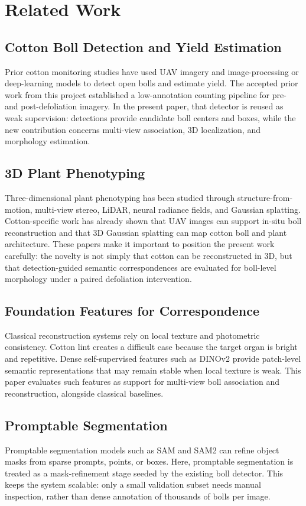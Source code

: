 \section{Related Work}

\subsection{Cotton Boll Detection and Yield Estimation}

Prior cotton monitoring studies have used UAV imagery and image-processing or deep-learning models to detect open bolls and estimate yield. The accepted prior work from this project established a low-annotation counting pipeline for pre- and post-defoliation imagery. In the present paper, that detector is reused as weak supervision: detections provide candidate boll centers and boxes, while the new contribution concerns multi-view association, 3D localization, and morphology estimation.

\subsection{3D Plant Phenotyping}

Three-dimensional plant phenotyping has been studied through structure-from-motion, multi-view stereo, LiDAR, neural radiance fields, and Gaussian splatting. Cotton-specific work has already shown that UAV images can support in-situ boll reconstruction and that 3D Gaussian splatting can map cotton boll and plant architecture. These papers make it important to position the present work carefully: the novelty is not simply that cotton can be reconstructed in 3D, but that detection-guided semantic correspondences are evaluated for boll-level morphology under a paired defoliation intervention.

\subsection{Foundation Features for Correspondence}

Classical reconstruction systems rely on local texture and photometric consistency. Cotton lint creates a difficult case because the target organ is bright and repetitive. Dense self-supervised features such as DINOv2 provide patch-level semantic representations that may remain stable when local texture is weak. This paper evaluates such features as support for multi-view boll association and reconstruction, alongside classical baselines.

\subsection{Promptable Segmentation}

Promptable segmentation models such as SAM and SAM2 can refine object masks from sparse prompts, points, or boxes. Here, promptable segmentation is treated as a mask-refinement stage seeded by the existing boll detector. This keeps the system scalable: only a small validation subset needs manual inspection, rather than dense annotation of thousands of bolls per image.
